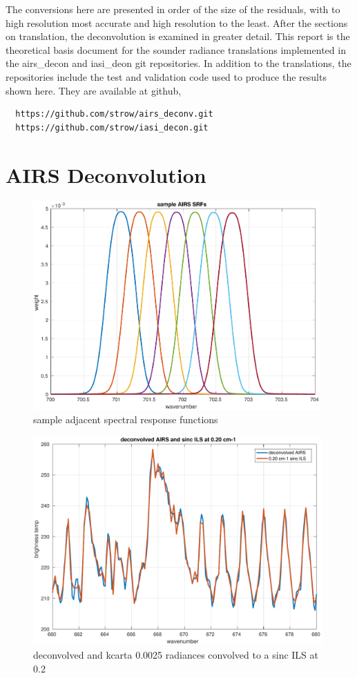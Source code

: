 \documentclass[12pt]{article}
\begin{document}
The conversions here are presented in order of the size of the
residuals, with {\iasi} to high resolution {\cris} most accurate and
high resolution {\cris} to {\airs} the least.  After the sections on
translation, the {\airs} deconvolution is examined in greater
detail.  This report is the theoretical basis document for the
sounder radiance translations implemented in the airs\_decon and
iasi\_deon git repositories.  In addition to the translations, the
repositories include the test and validation code used to produce
the results shown here.  They are available at github,
\begin{verbatim}
  https://github.com/strow/airs_deconv.git
  https://github.com/strow/iasi_decon.git
\end{verbatim}

\section{AIRS Deconvolution}
\label{decon}

\renewcommand{\vec}[1]{\mathbf{#1}}

\begin{figure}
  \centering
  \includegraphics[height=8cm]{figures/airs_sample_SRFs.pdf}
  \caption{sample adjacent {\airs} spectral response functions}
  \label{srfs1}
\end{figure}

\begin{figure}
  \centering
  \includegraphics[height=8cm]{figures/airs_decon_res.pdf}
  \caption{deconvolved {\airs} and kcarta 0.0025 {\wn} radiances
    convolved to a sinc ILS at 0.2 {\wn}}
  \label{dsinc}
\end{figure}
\end{document}
